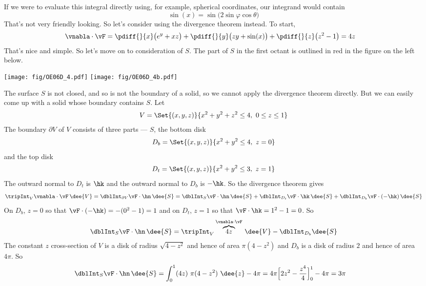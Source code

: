 \begin{solution}
If we were to evaluate this integral directly using, for example,
spherical coordinates, our integrand would contain
\begin{equation*}
\sin(x) = \sin\big(2\sin\varphi\cos\theta\big)
\end{equation*}
That's not very friendly looking. So let's consider using the divergence
theorem instead. To start, 
\begin{align*}
\vnabla\cdot\vF &= 
    \pdiff{}{x}\big(e^y + xz\big)
     +\pdiff{}{y}\big(zy + \sin(x)\big)
     +\pdiff{}{z}\big(z^2 - 1\big) 
   = 4z
\end{align*}
That's nice and simple. So let's move on to consideration of $S$.
The part of $S$ in the first octant is outlined in red in the figure 
on the left below.

\begin{center}
       \texttt{[image: fig/OE06D\_4.pdf]}\qquad
       \texttt{[image: fig/OE06D\_4b.pdf]}
\end{center}

The surface $S$ is not closed, and so is not the boundary of a solid,
so we cannot apply the divergence theorem directly. But we can easily
come up with a solid whose boundary contains $S$. Let
\begin{equation*}
V=\Set{(x,y,z)}{ x^2 + y^2 + z^2 \le 4,\ 0\le z\le 1}
\end{equation*}
The boundary $\partial V$ of $V$ consists of three parts --- $S$,
the bottom disk
\begin{equation*}
D_b = \Set{(x,y,z)}{x^2 + y^2 \le 4,\ z=0}
\end{equation*}
and the top disk
\begin{equation*}
D_t = \Set{(x,y,z)}{x^2 + y^2 \le 3,\ z=1}
\end{equation*}
The outward normal to $D_t$ is $\hk$ and the outward normal to $D_b$ is $-\hk$.
So the divergence theorem gives
\begin{align*}
\tripInt_V\vnabla\cdot\vF\,\dee{V}
=\dblInt_{\partial V} \vF\cdot\hn\,\dee{S}
=\dblInt_S \vF\cdot\hn\,\dee{S}
  +\dblInt_{D_t} \vF\cdot\hk\,\dee{S}
  +\dblInt_{D_b} \vF\cdot(-\hk)\,\dee{S}
\end{align*}
On $D_b$, $z=0$ so that $\vF\cdot(-\hk) = -(0^2-1)=1$ and
on $D_t$, $z=1$ so that $\vF\cdot\hk = 1^2-1=0$.
So
\begin{align*}
\dblInt_S \vF\cdot\hn\,\dee{S}
=\tripInt_V\overbrace{4z}^{\vnabla\cdot\vF}\,\dee{V}
   -\dblInt_{D_b} \dee{S}
\end{align*}
The constant $z$ cross-section of $V$ is a disk of radius $\sqrt{4-z^2}$
and hence of area $\pi(4-z^2)$ and $D_b$ is a disk of radius $2$ and hence
of area $4\pi$. So
\begin{align*}
\dblInt_S \vF\cdot\hn\,\dee{S}
&=\int_0^1 (4z)\ \pi(4-z^2) \ \dee{z}  -4\pi 
=4\pi\Big[2z^2 - \frac{z^4}{4}\Big]_0^1 -4\pi
=3\pi
\end{align*}
\end{solution}


